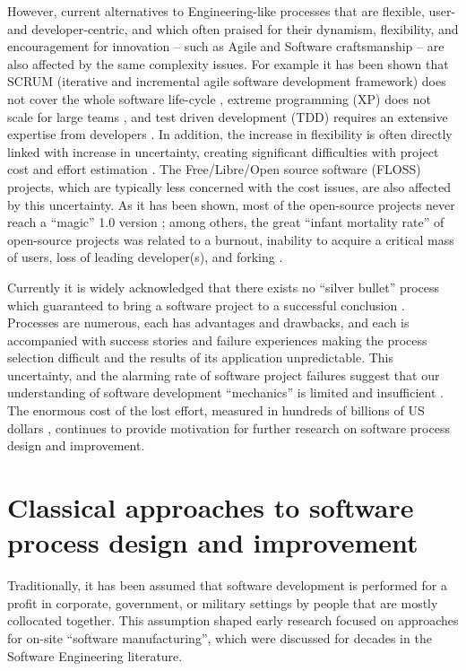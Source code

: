 However, current alternatives to Engineering-like processes that are flexible, user- and developer-centric,
and which often praised for their dynamism, flexibility, and encouragement for innovation --
such as Agile and Software craftsmanship -- are also affected by the same complexity issues. 
For example it has been shown that SCRUM (iterative and incremental agile software development framework) 
does not cover the whole software life-cycle \cite{Cohn_SCRUM}, 
extreme programming (XP) does not scale for large teams \cite{Beck_XP}, 
and test driven development (TDD) requires an extensive expertise from developers \cite{Beck_TDD}.
In addition, the increase in flexibility is often directly linked with increase in uncertainty, creating 
significant difficulties with project cost and effort estimation \cite{citeulike:12933080} \cite{citeulike:9928907}.
The Free/Libre/Open source software (FLOSS) projects, which are typically less concerned with the cost issues, 
are also affected by this uncertainty. 
As it has been shown, most of the open-source projects never reach a ``magic'' 1.0 version 
\cite{citeulike:12480029}; among others, the great ``infant mortality rate'' of open-source 
projects was related to a burnout, inability to acquire a critical mass of users, 
loss of leading developer(s), and forking \cite{richter2007critique}. 

Currently it is widely acknowledged that there exists no ``silver bullet'' process which 
guaranteed to bring a software project to a successful conclusion \cite{citeulike:1986013}. 
Processes are numerous, each has advantages and drawbacks, and each is accompanied with 
success stories and failure experiences making the process selection difficult and the results of 
its application unpredictable.
This uncertainty, and the alarming rate of software project failures suggest that our understanding 
of software development ``mechanics'' is limited and insufficient \cite{citeulike:12550665}. 
The enormous cost of the lost effort, measured in hundreds of billions of US dollars 
\cite{citeulike:2207657} \cite{citeulike:2207653} \cite{citeulike:2207655}, 
continues to provide motivation for further research on software process design and improvement. 

%
%
\section{Classical approaches to software process design and improvement}\label{section_software_process_design}
Traditionally, it has been assumed that software development is performed for a profit in 
corporate, government, or military settings by people that are mostly collocated together. 
This assumption shaped early research focused on approaches for on-site ``software manufacturing'',
which were discussed for decades in the Software Engineering literature. 

